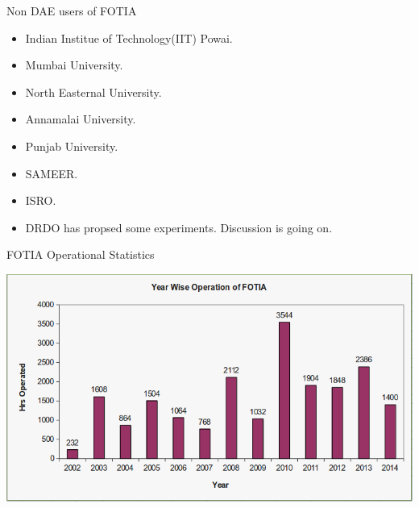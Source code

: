 \documentclass[11pt]{beamer}
\begin{document}
\begin{frame}{Non DAE users of FOTIA}
  
  
  \begin{itemize}
     
    
    \item Indian Institue of Technology(IIT) Powai. 
	\item Mumbai University.
	\item North Easternal University.
	\item Annamalai University.
	\item Punjab University.
	\item SAMEER.
	\item ISRO.
	\item DRDO has propsed some experiments. Discussion is going on.          
    
   \end{itemize}


\end{frame}







\begin{frame}{FOTIA Operational Statistics}
  
  
  \includegraphics[width=\linewidth]{operational_data.png}


\end{frame}
\end{document}
